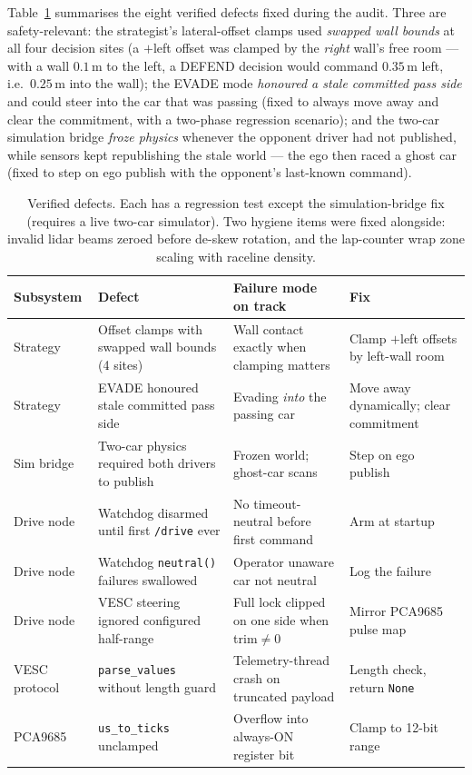 \documentclass[11pt]{article}
\newcommand{\m}[1]{$#1\,\mathrm{m}$}
\begin{document}
Table~\ref{tab:bugs} summarises the eight verified defects fixed during
the audit.  Three are safety-relevant: the strategist's lateral-offset
clamps used \emph{swapped wall bounds} at all four decision sites (a
$+$left offset was clamped by the \emph{right} wall's free room --- with
a wall \m{0.1} to the left, a DEFEND decision would command \m{0.35}
left, i.e.\ \m{0.25} into the wall); the EVADE mode \emph{honoured a
stale committed pass side} and could steer into the car that was passing
(fixed to always move away and clear the commitment, with a two-phase
regression scenario); and the two-car simulation bridge \emph{froze
physics} whenever the opponent driver had not published, while sensors
kept republishing the stale world --- the ego then raced a ghost car
(fixed to step on ego publish with the opponent's last-known command).

\begin{table}[t]
  \centering
  \small
  \begin{tabular}{@{}p{2.0cm}p{4.8cm}p{4.0cm}p{3.4cm}@{}}
    \toprule
    Subsystem & Defect & Failure mode on track & Fix \\
    \midrule
    Strategy & Offset clamps with swapped wall bounds (4 sites) &
    Wall contact exactly when clamping matters &
    Clamp $+$left offsets by left-wall room \\
    \addlinespace
    Strategy & EVADE honoured stale committed pass side &
    Evading \emph{into} the passing car &
    Move away dynamically; clear commitment \\
    \addlinespace
    Sim bridge & Two-car physics required both drivers to publish &
    Frozen world; ghost-car scans &
    Step on ego publish \\
    \addlinespace
    Drive node & Watchdog disarmed until first \texttt{/drive} ever &
    No timeout-neutral before first command &
    Arm at startup \\
    \addlinespace
    Drive node & Watchdog \texttt{neutral()} failures swallowed &
    Operator unaware car not neutral &
    Log the failure \\
    \addlinespace
    Drive node & VESC steering ignored configured half-range &
    Full lock clipped on one side when trim${}\neq0$ &
    Mirror PCA9685 pulse map \\
    \addlinespace
    VESC protocol & \texttt{parse\_values} without length guard &
    Telemetry-thread crash on truncated payload &
    Length check, return \texttt{None} \\
    \addlinespace
    PCA9685 & \texttt{us\_to\_ticks} unclamped &
    Overflow into always-ON register bit &
    Clamp to 12-bit range \\
    \bottomrule
  \end{tabular}
  \caption{Verified defects.  Each has a regression test except the
  simulation-bridge fix (requires a live two-car simulator).  Two
  hygiene items were fixed alongside: invalid lidar beams zeroed before
  de-skew rotation, and the lap-counter wrap zone scaling with raceline
  density.}
  \label{tab:bugs}
\end{table}
\end{document}
